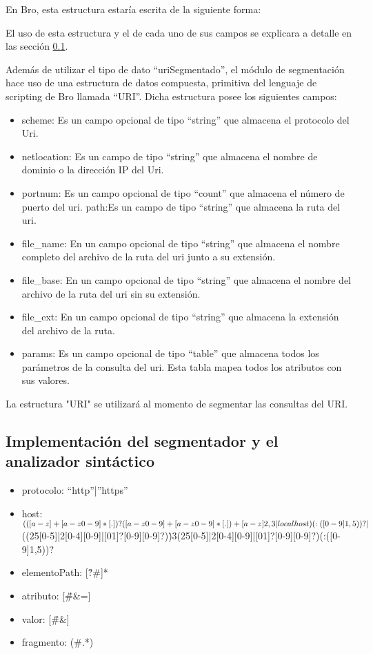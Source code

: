 En Bro, esta estructura estaría escrita de la siguiente forma:

El uso de esta estructura y el de cada uno de sus campos se explicara a detalle en las sección \ref{subsec:implementacionAutom}.

Además de utilizar el tipo de dato “uriSegmentado”, el módulo de segmentación hace uso de una estructura de datos compuesta, primitiva del lenguaje de scripting de Bro llamada  “URI”. Dicha estructura posee los siguientes campos:

\begin{itemize}
\item scheme: Es un campo opcional de tipo “string” que almacena el protocolo del Uri.

\item netlocation: Es un campo de tipo “string” que almacena el nombre de dominio o la dirección IP del Uri.

\item portnum: Es un campo opcional de tipo “count”  que almacena el número de puerto del uri.
path:Es un campo de tipo “string” que almacena la ruta del uri.

\item file\_name: En un campo opcional de tipo “string” que almacena el nombre completo  del archivo de la ruta del uri junto a su extensión.

\item file\_base: En un campo opcional de tipo “string” que almacena el nombre  del archivo de la ruta del uri sin su extensión.

\item file\_ext: En un campo opcional de tipo “string” que almacena la extensión del archivo de la ruta.

\item params: Es un campo opcional de tipo “table” que almacena todos los parámetros de la consulta del uri. Esta tabla mapea todos los atributos con sus valores.
\end{itemize}

La estructura "URI" se utilizará al momento de segmentar las consultas del URI.

\subsection{Implementación del segmentador y el analizador sintáctico}\label{subsec:implementacionAutom}

\begin{itemize}
\item protocolo: “http”|”https”
\item host: $(([a-z]+[a-z0-9\-]*[.])?([a-z0-9]+[a-z0-9\-]*[.])+[a-z]{2,3}|localhost)(:([0-9]{1,5}))?|$\\ ((25[0-5]|2[0-4][0-9]|[01]?[0-9][0-9]?)\.){3}(25[0-5]|2[0-4][0-9]|[01]?[0-9][0-9]?)(:([0-9]{1,5}))?
\item elementoPath: [\^?\#]*
\item atributo: [\^\#\&=]
\item valor: [\^\#\&]
\item fragmento: (\#.*)
\end{itemize}

